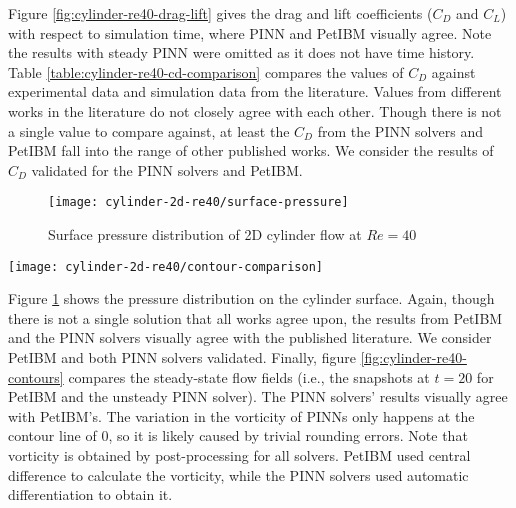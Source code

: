 Figure \ref{fig:cylinder-re40-drag-lift} gives the drag and lift coefficients ($C_D$ and $C_L$) with respect to simulation time, where PINN and PetIBM visually agree.
Note the results with steady PINN were omitted as it does not have time history.
Table \ref{table:cylinder-re40-cd-comparison} compares the values of $C_D$ against experimental data and simulation data from the literature.
Values from different works in the literature do not closely agree with each other.
Though there is not a single value to compare against, at least the $C_D$ from the PINN solvers and PetIBM fall into the range of other published works.
We consider the results of $C_D$ validated for the PINN solvers and PetIBM.


\begin{figure}
    \centering%
    \texttt{[image: cylinder-2d-re40/surface-pressure]}%
    \caption{%
        Surface pressure distribution of 2D cylinder flow at $Re=\num{40}$
    }
    \label{fig:cylinder-re40-pinn-surfp}%
\end{figure}


\begin{figure*}
    \centering%
    \texttt{[image: cylinder-2d-re40/contour-comparison]}%
    \caption{%
        Contour plots for 2D cylinder flow at $Re=\num{40}$
    }
    \label{fig:cylinder-re40-contours}%
\end{figure*}

Figure \ref{fig:cylinder-re40-pinn-surfp} shows the pressure distribution on the cylinder surface.
Again, though there is not a single solution that all works agree upon, the results from PetIBM and the PINN solvers visually agree with the published literature.
We consider PetIBM and both PINN solvers validated.
Finally, figure \ref{fig:cylinder-re40-contours} compares the steady-state flow fields (i.e., the snapshots at $t=20$ for PetIBM and the unsteady PINN solver).
The PINN solvers' results visually agree with PetIBM's.
The variation in the vorticity of PINNs only happens at the contour line of \num{0}, so it is likely caused by trivial rounding errors.
Note that vorticity is obtained by post-processing for all solvers.
PetIBM used central difference to calculate the vorticity, while the PINN solvers used automatic differentiation to obtain it.


